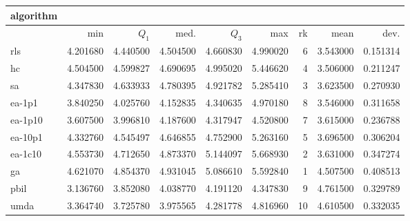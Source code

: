 \begin{tabular}{@{}l*{5}{>{{}}N{1}{2}}>{{}}N{2}{0}N{1}{3}N{1}{3}@{}}
\toprule
{algorithm} &  &  \\
\midrule
& {min} & {$Q_1$} & {med.} & {$Q_3$} & {max} & {rk} & {mean} & {dev.} \\
\midrule
rls & 4.201680 & 4.440500 & 4.504500 & 4.660830 & 4.990020 & 6 & 3.543000 & 0.151314 \\
 hc & 4.504500 & 4.599827 & 4.690695 & 4.995020 & 5.446620 & 4 & 3.506000 & 0.211247 \\
 sa & 4.347830 & 4.633933 & 4.780395 & 4.921782 & 5.285410 & 3 & 3.623500 & 0.270930 \\
 ea-1p1 & 3.840250 & 4.025760 & 4.152835 & 4.340635 & 4.970180 & 8 & 3.546000 & 0.311658 \\
 ea-1p10 & 3.607500 & 3.996810 & 4.187600 & 4.317947 & 4.520800 & 7 & 3.615000 & 0.236788 \\
 ea-10p1 & 4.332760 & 4.545497 & 4.646855 & 4.752900 & 5.263160 & 5 & 3.696500 & 0.306204 \\
 ea-1c10 & 4.553730 & 4.712650 & 4.873370 & {\color{blue}} 5.144097 & {\color{blue}} 5.668930 & 2 & 3.631000 & 0.347274 \\
 ga & {\color{blue}} 4.621070 & {\color{blue}} 4.854370 & {\color{blue}} 4.931045 & 5.086610 & 5.592840 & 1 & 4.507500 & 0.408513 \\
 pbil & 3.136760 & 3.852080 & 4.038770 & 4.191120 & 4.347830 & 9 & 4.761500 & 0.329789 \\
 umda & 3.364740 & 3.725780 & 3.975565 & 4.281778 & 4.816960 & 10 & 4.610500 & 0.332035 \\
 \bottomrule
\end{tabular}
